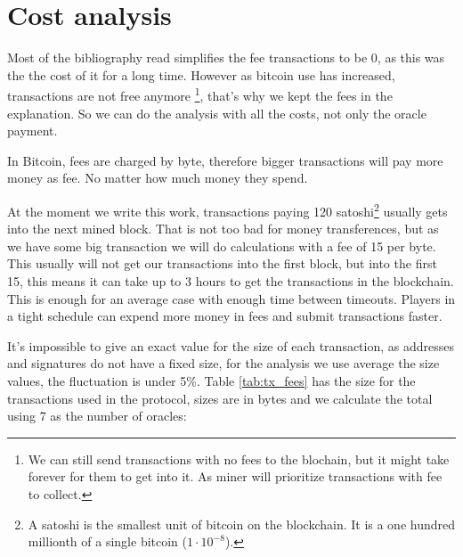 \section {Cost analysis} \label{sec:cost_analysis}
\newcommand\numoracles[0]{7}%
\newcommand\feeval[0]{15}%
\newcommand\bitcoinusd[0]{3800}%
\newcommand\txcost[2]{\calculatecosts{#1}{#2}{\numoracles{}}{\feeval{}}}%
\newcommand\usdcost[1]{\satoshitousd{#1}{\bitcoinusd{}}}%

Most of the bibliography read simplifies the fee transactions to be 0,
  as this was the the cost of it for a long time.
However as bitcoin use has increased, transactions are not free anymore
  \footnote{We can still send transactions with no fees to the blochain, but it
    might take forever for them to get into it. As miner will prioritize
    transactions with fee to collect.}, that's why we kept the fees in the
  explanation.
So we can do the analysis with all the costs, not only the oracle payment.

In Bitcoin, fees are charged by byte, therefore bigger transactions will pay more
  money as fee.
No matter how much money they spend.

At the moment we write this work, transactions paying 120 satoshi\footnote{A
  satoshi is the smallest unit of bitcoin on the blockchain. It is a one hundred
  millionth of a single bitcoin ($1 \cdot 10^{-8}$).} usually gets into the next
  mined block.
That is not too bad for money transferences, but as we have some big transaction
  we will do calculations with a fee of \feeval{} per byte.
This usually will not get our transactions into the first block, but into the
  first 15, this means it can take up to 3 hours to get the transactions in
  the blockchain.
This is enough for an average case with enough time between timeouts.
Players in a tight schedule can expend more money in fees and submit
  transactions faster.

It's impossible to give an exact value for the size of each transaction, as
  addresses and signatures do not have a fixed size, for the analysis we use
  average the size values, the fluctuation is under 5\%.
Table \ref{tab:tx_fees} has the size for the transactions used in the protocol,
  sizes are in bytes and we calculate the total using \numoracles{} as the number
  of oracles:

